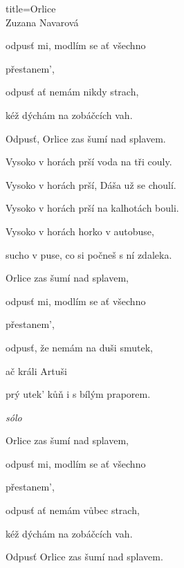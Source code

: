\begin{song}{title=\predtitle\centering Orlice \\\large Zuzana Navarová  \vspace*{-0.3cm}}
\begin{centerjustified}
\begin{varwidth}[t]{0.5\textwidth}
	odpusť mi, modlím se ať všechno

	přestanem',

	odpusť ať nemám nikdy strach,

	kéž dýchám na zobáčcích vah.

	Odpusť, Orlice zas šumí nad splavem.

	Vysoko v horách prší voda na tři couly.

	Vysoko v horách prší, Dáša už se choulí.

	Vysoko v horách prší na kalhotách bouli.

	Vysoko v horách horko v autobuse,

	sucho v puse, co si počneš s ní zdaleka.

\sloka
	Orlice zas šumí nad splavem,

	odpusť mi, modlím se ať všechno

	přestanem',

	odpusť, že nemám na duši smutek,

	ač králi Artuši

	prý utek' kůň i s bílým praporem.

\textit{sólo}

\sloka
	Orlice zas šumí nad splavem,

	odpusť mi, modlím se ať všechno

	přestanem',

	odpusť ať nemám vůbec strach,

	kéž dýchám na zobáčcích vah.

	Odpusť Orlice zas šumí nad splavem.
\end{varwidth}

\end{centerjustified}
\setcounter{Slokočet}{0}
\end{song}
